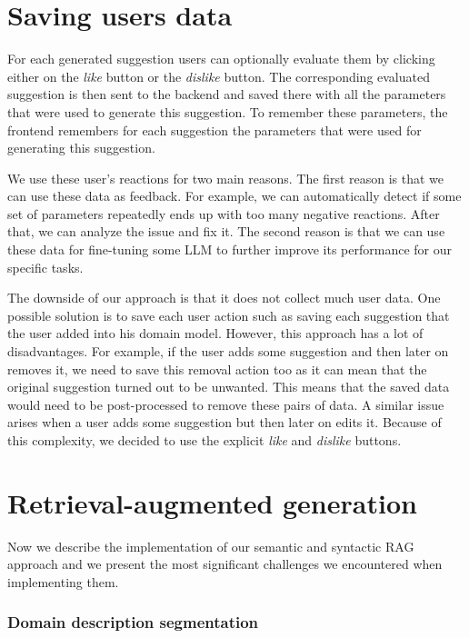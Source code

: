 

\section{Saving users data}

For each generated suggestion users can optionally evaluate them by clicking either on the \emph{like} button or the \emph{dislike} button. The corresponding evaluated suggestion is then sent to the backend and saved there with all the parameters that were used to generate this suggestion. To remember these parameters, the frontend remembers for each suggestion the parameters that were used for generating this suggestion.

We use these user's reactions for two main reasons. The first reason is that we can use these data as feedback. For example, we can automatically detect if some set of parameters repeatedly ends up with too many negative reactions. After that, we can analyze the issue and fix it. The second reason is that we can use these data for fine-tuning some LLM to further improve its performance for our specific tasks.

The downside of our approach is that it does not collect much user data. One possible solution is to save each user action such as saving each suggestion that the user added into his domain model. However, this approach has a lot of disadvantages. For example, if the user adds some suggestion and then later on removes it, we need to save this removal action too as it can mean that the original suggestion turned out to be unwanted. This means that the saved data would need to be post-processed to remove these pairs of data. A similar issue arises when a user adds some suggestion but then later on edits it. Because of this complexity, we decided to use the explicit \emph{like} and \emph{dislike} buttons.


\section{Retrieval-augmented generation}
\label{sec:rag_implementation}

Now we describe the implementation of our semantic and syntactic RAG approach and we present the most significant challenges we encountered when implementing them.


\subsubsection{Domain description segmentation}

